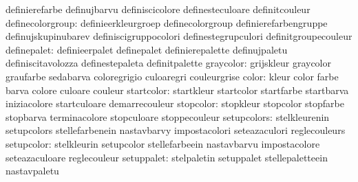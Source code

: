                                   definierefarbe                   definujbarvu
                                  definiscicolore                  definesteculoare
                                  definitcouleur
                definecolorgroup: definieerkleurgroep              definecolorgroup
                                  definierefarbengruppe            definujskupinubarev
                                  definiscigruppocolori            definestegrupculori
                                  definitgroupecouleur
                     definepalet: definieerpalet                   definepalet
                                  definierepalette                 definujpaletu
                                  definiscitavolozza               definestepaleta
                                  definitpalette
                       graycolor: grijskleur                       graycolor
                                  graufarbe                        sedabarva
                                  coloregrigio                     culoaregri
                                  couleurgrise
                           color: kleur                            color
                                  farbe                            barva
                                  colore                           culoare
                                  couleur
                      startcolor: startkleur                       startcolor
                                  startfarbe                       startbarva
                                  iniziacolore                     startculoare
                                  demarrecouleur
                       stopcolor: stopkleur                        stopcolor
                                  stopfarbe                        stopbarva
                                  terminacolore                    stopculoare
                                  stoppecouleur
                     setupcolors: stelkleurenin                    setupcolors
                                  stellefarbenein                  nastavbarvy
                                  impostacolori                    seteazaculori
                                  reglecouleurs
                      setupcolor: stelkleurin                      setupcolor
                                  stellefarbeein                   nastavbarvu
                                  impostacolore                    seteazaculoare
                                  reglecouleur
                      setuppalet: stelpaletin                      setuppalet
                                  stellepaletteein                 nastavpaletu
